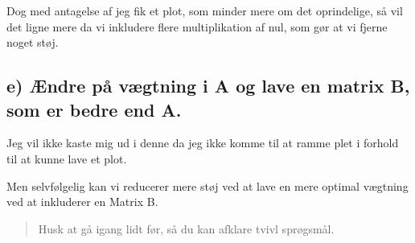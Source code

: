 \documentclass[
]{article}
\begin{document}
Dog med antagelse af jeg fik et plot, som minder mere om det
oprindelige, så vil det ligne mere da vi inkludere flere multiplikation
af nul, som gør at vi fjerne noget støj.

\hypertarget{e-uxe6ndre-puxe5-vuxe6gtning-i-a-og-lave-en-matrix-b-som-er-bedre-end-a.}{%
\subsection{e) Ændre på vægtning i A og lave en matrix B, som er bedre
end
A.}\label{e-uxe6ndre-puxe5-vuxe6gtning-i-a-og-lave-en-matrix-b-som-er-bedre-end-a.}}

Jeg vil ikke kaste mig ud i denne da jeg ikke komme til at ramme plet i
forhold til at kunne lave et plot.

Men selvfølgelig kan vi reducerer mere støj ved at lave en mere optimal
vægtning ved at inkluderer en Matrix B.

\begin{quote}
Husk at gå igang lidt før, så du kan afklare tvivl sprøgsmål.
\end{quote}
\end{document}
